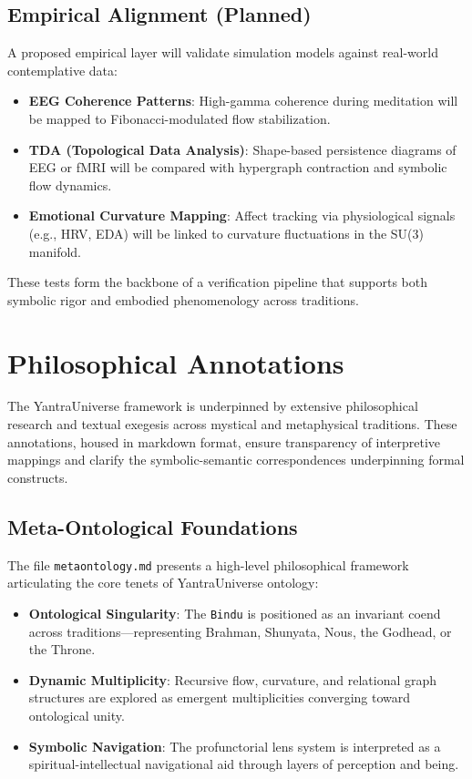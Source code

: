 \documentclass[12pt]{article}
\theoremstyle{plain}
\begin{document}
\subsection{Empirical Alignment (Planned)}

A proposed empirical layer will validate simulation models against real-world contemplative data:

\begin{itemize}
  \item \textbf{EEG Coherence Patterns}: High-gamma coherence during meditation will be mapped to Fibonacci-modulated flow stabilization.
  \item \textbf{TDA (Topological Data Analysis)}: Shape-based persistence diagrams of EEG or fMRI will be compared with hypergraph contraction and symbolic flow dynamics.
  \item \textbf{Emotional Curvature Mapping}: Affect tracking via physiological signals (e.g., HRV, EDA) will be linked to curvature fluctuations in the SU(3) manifold.
\end{itemize}

These tests form the backbone of a verification pipeline that supports both symbolic rigor and embodied phenomenology across traditions.

\section{Philosophical Annotations}

The YantraUniverse framework is underpinned by extensive philosophical research and textual exegesis across mystical and metaphysical traditions. These annotations, housed in markdown format, ensure transparency of interpretive mappings and clarify the symbolic-semantic correspondences underpinning formal constructs.

\subsection{Meta-Ontological Foundations}

The file \texttt{metaontology.md} presents a high-level philosophical framework articulating the core tenets of YantraUniverse ontology:

\begin{itemize}
  \item \textbf{Ontological Singularity}: The \texttt{Bindu} is positioned as an invariant coend across traditions—representing Brahman, Shunyata, Nous, the Godhead, or the Throne.
  \item \textbf{Dynamic Multiplicity}: Recursive flow, curvature, and relational graph structures are explored as emergent multiplicities converging toward ontological unity.
  \item \textbf{Symbolic Navigation}: The profunctorial lens system is interpreted as a spiritual-intellectual navigational aid through layers of perception and being.
\end{itemize}
\end{document}
